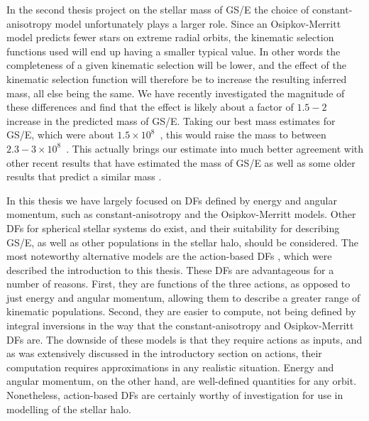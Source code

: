 In the second thesis project on the stellar mass of GS/E the choice of constant-anisotropy model unfortunately plays a larger role. Since an Osipkov-Merritt model predicts fewer stars on extreme radial orbits, the kinematic selection functions used will end up having a smaller typical value. In other words the completeness of a given kinematic selection will be lower, and the effect of the kinematic selection function will therefore be to increase the resulting inferred mass, all else being the same. We have recently investigated the magnitude of these differences and find that the effect is likely about a factor of $1.5-2$ increase in the predicted mass of GS/E. Taking our best mass estimates for GS/E, which were about $1.5\times10^{8}$~\Msun, this would raise the mass to between $2.3-3\times10^{8}$~\Msun. This actually brings our estimate into much better agreement with other recent results that have estimated the mass of GS/E \parencite[e.g.][]{callingham22,han22,carrillo23} as well as some older results that predict a similar mass \parencite[e.g.][]{kruijssen19b,mackereth20}.

In this thesis we have largely focused on DFs defined by energy and angular momentum, such as constant-anisotropy and the Osipkov-Merritt models. Other DFs for spherical stellar systems do exist, and their suitability for describing GS/E, as well as other populations in the stellar halo, should be considered. The most noteworthy alternative models are the action-based DFs \parencite{binney14d,posti15}, which were described the introduction to this thesis. These DFs are advantageous for a number of reasons. First, they are functions of the three actions, as opposed to just energy and angular momentum, allowing them to describe a greater range of kinematic populations. Second, they are easier to compute, not being defined by integral inversions in the way that the constant-anisotropy and Osipkov-Merritt DFs are. The downside of these models is that they require actions as inputs, and as was extensively discussed in the introductory section on actions, their computation requires approximations in any realistic situation. Energy and angular momentum, on the other hand, are well-defined quantities for any orbit. Nonetheless, action-based DFs are certainly worthy of investigation for use in modelling of the stellar halo.

